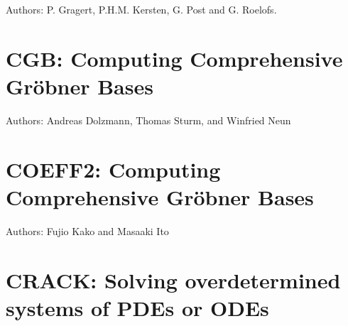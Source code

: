 Authors: P. Gragert, P.H.M. Kersten, G. Post and G. Roelofs.



\newpage

\section{CGB: Computing Comprehensive Gr\"obner Bases}

Authors: Andreas Dolzmann, Thomas Sturm, and Winfried Neun



\newpage

\section{COEFF2: Computing Comprehensive Gr\"obner Bases}

Authors: Fujio Kako and Masaaki Ito



\newpage

\iffalse
\section{COMPACT: Package for compacting expressions}
\indexpackage{Compact}

\ttindextype{COMPACT}{operator}
COMPACT is a package of functions for the reduction of a polynomial in the
presence of side relations.  COMPACT applies the side relations to the
polynomial so that an equivalent expression results with as few terms as
possible.  For example, the evaluation of
\begin{verbatim}
     compact(s*(1-sin x^2)+c*(1-cos x^2)+sin x^2+cos x^2,
             {cos x^2+sin x^2=1});
\end{verbatim}
yields the result\pagebreak[1]
\begin{verbatim}
              2           2
        SIN(X) *C + COS(X) *S + 1 .
\end{verbatim}
The switch \sw{TRCOMPACT} can be used to trace the operation.
\ttindexswitch[COMPACT]{TRCOMPACT}

Author:  Anthony C. Hearn.
\fi

\section{CRACK: Solving overdetermined systems of PDEs or ODEs}

